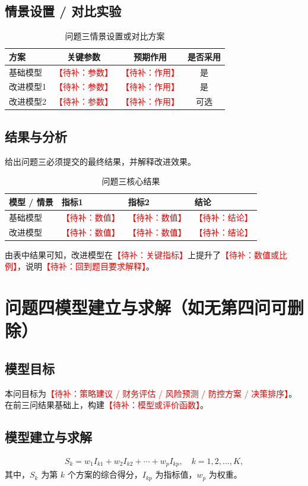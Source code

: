 \documentclass[UTF8,a4paper,zihao=5]{ctexart}
\numberwithin{equation}{section}
\numberwithin{figure}{section}
\numberwithin{table}{section}
\newcommand{\todo}[1]{\textcolor{red}{【待补：#1】}}
\begin{document}
\subsection{情景设置 / 对比实验}
\begin{table}[H]
  \centering
  \caption{问题三情景设置或对比方案}
  \begin{tabular}{lccc}
    \toprule
    方案 & 关键参数 & 预期作用 & 是否采用 \\
    \midrule
    基础模型 & \todo{参数} & \todo{作用} & 是 \\
    改进模型1 & \todo{参数} & \todo{作用} & 是 \\
    改进模型2 & \todo{参数} & \todo{作用} & 可选 \\
    \bottomrule
  \end{tabular}
\end{table}

\subsection{结果与分析}
给出问题三必须提交的最终结果，并解释改进效果。
\begin{table}[H]
  \centering
  \caption{问题三核心结果}
  \begin{tabularx}{\linewidth}{lXXX}
    \toprule
    模型 / 情景 & 指标1 & 指标2 & 结论 \\
    \midrule
    基础模型 & \todo{数值} & \todo{数值} & \todo{结论} \\
    改进模型 & \todo{数值} & \todo{数值} & \todo{结论} \\
    \bottomrule
  \end{tabularx}
\end{table}

由表中结果可知，改进模型在\todo{关键指标}上提升了\todo{数值或比例}，说明\todo{回到题目要求解释}。

\section{问题四模型建立与求解（如无第四问可删除）}

\subsection{模型目标}
本问目标为\todo{策略建议 / 财务评估 / 风险预测 / 防控方案 / 决策排序}。在前三问结果基础上，构建\todo{模型或评价函数}。

\subsection{模型建立与求解}
\begin{align}
  S_k = w_1 I_{k1} + w_2 I_{k2} + \cdots + w_p I_{kp}, \quad k=1,2,\dots,K,
\end{align}
其中，$S_k$ 为第 $k$ 个方案的综合得分，$I_{kp}$ 为指标值，$w_p$ 为权重。
\end{document}
